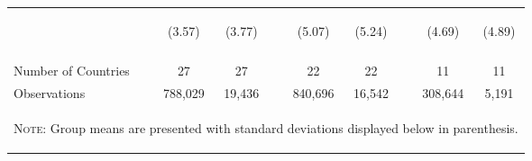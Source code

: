 \documentclass{article}[11pt,subeqn]
\begin{document}
\begin{spacing}{1.5}
\begin{table}[ht]
\begin{center}
\begin{tabular}{lccp{5mm}ccp{5mm}cc}
\begin{footnotesize}\end{footnotesize}	& \begin{footnotesize} (3.57)\end{footnotesize} & \begin{footnotesize} (3.77)\end{footnotesize} & \begin{footnotesize} 	\end{footnotesize} & \begin{footnotesize} (5.07)\end{footnotesize} & \begin{footnotesize} (5.24)\end{footnotesize} & \begin{footnotesize} 	\end{footnotesize} & \begin{footnotesize} (4.69)\end{footnotesize} & \begin{footnotesize} (4.89)\end{footnotesize}	\\
\\ \midrule																
Number of Countries & 27 & 27 & & 22 & 22 & & 11 & 11 \\
Observations & 788,029 & 19,436 & &  840,696  & 16,542 & & 308,644  & 5,191 \\ 
\bottomrule																
\multicolumn{9}{p{12cm}}{\setstretch{0.9}\begin{footnotesize}\textsc{Note:} Group means are presented with standard deviations displayed below in parenthesis.\end{footnotesize}}\\

\end{tabular}
\end{center}
\end{table}
\vspace{-3mm}


\end{spacing}
\end{document}
